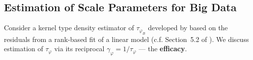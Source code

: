 \subsection{Estimation of Scale Parameters for Big Data}
\label{sect:bd_tauhat}
Consider a kernel type density estimator of $\tau_{\varphi_B}$ developed by
\citet{ah84} based on the residuals from a rank-based fit of a linear model (c.f. Section~5.2 of \citet*{th84}).
We discuss estimation of $\tau_\varphi$
via its reciprocal $\gamma_\varphi=1/\tau_\varphi$ --- the {\bf efficacy}.

